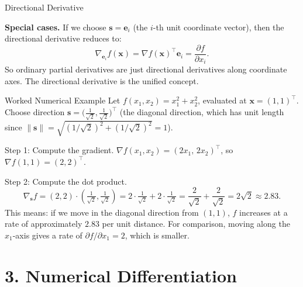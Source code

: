 \documentclass[aspectratio=169,10pt]{beamer}
\newcommand{\x}{\mathbf{x}}
\begin{document}
\begin{frame}[allowframebreaks]{Directional Derivative}
  \framebreak

  \textbf{Special cases.}
  If we choose $\mathbf{s} = \mathbf{e}_i$ (the $i$-th unit coordinate
  vector), then the directional derivative reduces to:
  \[
    \nabla_{\mathbf{e}_i} f(\x)
    = \nabla f(\x)^\top \mathbf{e}_i
    = \frac{\partial f}{\partial x_i}.
  \]
  So ordinary partial derivatives are just directional derivatives along
  coordinate axes.  The directional derivative is the unified concept.

  \medskip
  \begin{exampleblock}{Worked Numerical Example}
    Let $f(x_1,x_2) = x_1^2 + x_2^2$, evaluated at $\x=(1,1)^\top$.
    Choose direction $\mathbf{s} = \bigl(\tfrac{1}{\sqrt{2}},
    \tfrac{1}{\sqrt{2}}\bigr)^\top$ (the diagonal direction, which has
    unit length since $\|\mathbf{s}\| = \sqrt{(1/\sqrt{2})^2+(1/\sqrt{2})^2}=1$).

    Step 1: Compute the gradient.
    $\nabla f(x_1,x_2) = (2x_1,\,2x_2)^\top$,
    so $\nabla f(1,1) = (2,2)^\top$.

    Step 2: Compute the dot product.
    \[
      \nabla_\mathbf{s} f = (2,2) \cdot \left(\tfrac{1}{\sqrt{2}},\tfrac{1}{\sqrt{2}}\right)
      = 2\cdot\tfrac{1}{\sqrt{2}} + 2\cdot\tfrac{1}{\sqrt{2}}
      = \frac{2}{\sqrt{2}} + \frac{2}{\sqrt{2}}
      = 2\sqrt{2} \approx 2.83.
    \]
    This means: if we move in the diagonal direction from $(1,1)$, $f$
    increases at a rate of approximately $2.83$ per unit distance.
    For comparison, moving along the $x_1$-axis gives a rate of
    $\partial f/\partial x_1 = 2$, which is smaller.
  \end{exampleblock}

\end{frame}

\section{3. Numerical Differentiation}
\end{document}

